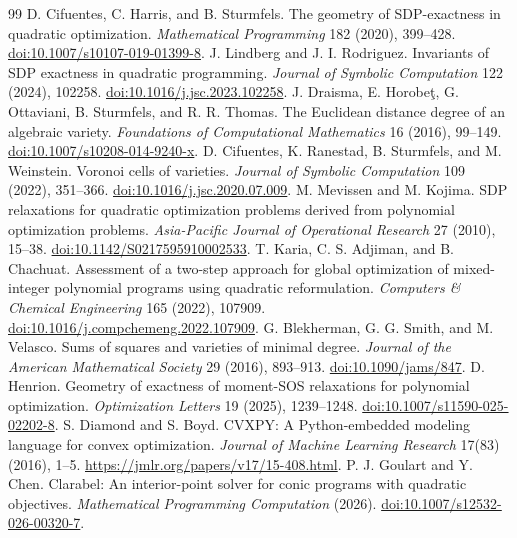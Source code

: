 \documentclass[11pt]{article}
\theoremstyle{definition}\newtheorem{definition}[theorem]{Definition}
\theoremstyle{remark}\newtheorem{remark}[theorem]{Remark}
\begin{document}
\begin{thebibliography}{99}\small
{} D. Cifuentes, C. Harris, and B. Sturmfels. The geometry of SDP-exactness in quadratic optimization. \emph{Mathematical Programming} 182 (2020), 399--428. \href{https://doi.org/10.1007/s10107-019-01399-8}{doi:10.1007/s10107-019-01399-8}.
 J. Lindberg and J. I. Rodriguez. Invariants of SDP exactness in quadratic programming. \emph{Journal of Symbolic Computation} 122 (2024), 102258. \href{https://doi.org/10.1016/j.jsc.2023.102258}{doi:10.1016/j.jsc.2023.102258}.
 J. Draisma, E. Horobe\c{t}, G. Ottaviani, B. Sturmfels, and R. R. Thomas. The Euclidean distance degree of an algebraic variety. \emph{Foundations of Computational Mathematics} 16 (2016), 99--149. \href{https://doi.org/10.1007/s10208-014-9240-x}{doi:10.1007/s10208-014-9240-x}.
 D. Cifuentes, K. Ranestad, B. Sturmfels, and M. Weinstein. Voronoi cells of varieties. \emph{Journal of Symbolic Computation} 109 (2022), 351--366. \href{https://doi.org/10.1016/j.jsc.2020.07.009}{doi:10.1016/j.jsc.2020.07.009}.
 M. Mevissen and M. Kojima. SDP relaxations for quadratic optimization problems derived from polynomial optimization problems. \emph{Asia-Pacific Journal of Operational Research} 27 (2010), 15--38. \href{https://doi.org/10.1142/S0217595910002533}{doi:10.1142/S0217595910002533}.
 T. Karia, C. S. Adjiman, and B. Chachuat. Assessment of a two-step approach for global optimization of mixed-integer polynomial programs using quadratic reformulation. \emph{Computers \& Chemical Engineering} 165 (2022), 107909. \href{https://doi.org/10.1016/j.compchemeng.2022.107909}{doi:10.1016/j.compchemeng.2022.107909}.
 G. Blekherman, G. G. Smith, and M. Velasco. Sums of squares and varieties of minimal degree. \emph{Journal of the American Mathematical Society} 29 (2016), 893--913. \href{https://doi.org/10.1090/jams/847}{doi:10.1090/jams/847}.
 D. Henrion. Geometry of exactness of moment-SOS relaxations for polynomial optimization. \emph{Optimization Letters} 19 (2025), 1239--1248. \href{https://doi.org/10.1007/s11590-025-02202-8}{doi:10.1007/s11590-025-02202-8}.
 S. Diamond and S. Boyd. CVXPY: A Python-embedded modeling language for convex optimization. \emph{Journal of Machine Learning Research} 17(83) (2016), 1--5. \url{https://jmlr.org/papers/v17/15-408.html}.
 P. J. Goulart and Y. Chen. Clarabel: An interior-point solver for conic programs with quadratic objectives. \emph{Mathematical Programming Computation} (2026). \href{https://doi.org/10.1007/s12532-026-00320-7}{doi:10.1007/s12532-026-00320-7}.
\end{thebibliography}
\end{document}
